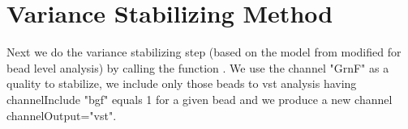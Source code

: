 \section{Variance Stabilizing Method}
Next we do the variance stabilizing step (based on the model from \cite{lin_model-based_2008} modified for bead level analysis) by calling the function . We use the channel "GrnF" as a quality to stabilize, we include only those beads to vst analysis having channelInclude "bgf" equals 1 for a given bead and we produce a new channel channelOutput="vst".